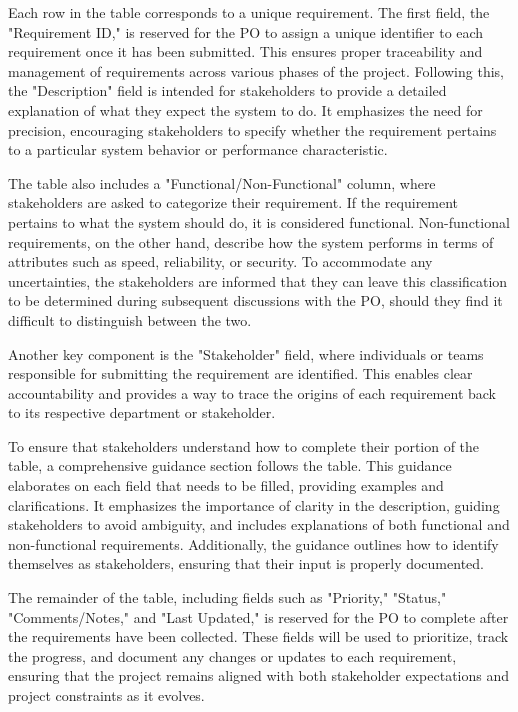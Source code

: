 Each row in the table corresponds to a unique requirement. The first field, the "Requirement ID," is reserved for the
\acs{PO} to assign a unique identifier to each requirement once it has been submitted. This ensures proper traceability
and management of requirements across various phases of the project. Following this, the "Description" field is intended
for stakeholders to provide a detailed explanation of what they expect the system to do. It emphasizes the need for
precision, encouraging stakeholders to specify whether the requirement pertains to a particular system behavior or
performance characteristic.

The table also includes a "Functional/Non-Functional" column, where stakeholders are asked to categorize their
requirement. If the requirement pertains to what the system should do, it is considered functional. Non-functional
requirements, on the other hand, describe how the system performs in terms of attributes such as speed, reliability, or
security. To accommodate any uncertainties, the stakeholders are informed that they can leave this classification to be
determined during subsequent discussions with the \acs{PO}, should they find it difficult to distinguish between the
two.

Another key component is the "Stakeholder" field, where individuals or teams responsible for submitting the requirement
are identified. This enables clear accountability and provides a way to trace the origins of each requirement back to
its respective department or stakeholder.

To ensure that stakeholders understand how to complete their portion of the table, a comprehensive guidance section
follows the table. This guidance elaborates on each field that needs to be filled, providing examples and
clarifications. It emphasizes the importance of clarity in the description, guiding stakeholders to avoid ambiguity, and
includes explanations of both functional and non-functional requirements. Additionally, the guidance outlines how to
identify themselves as stakeholders, ensuring that their input is properly documented.

The remainder of the table, including fields such as "Priority," "Status," "Comments/Notes," and "Last Updated," is
reserved for the \acs{PO} to complete after the requirements have been collected. These fields will be used to
prioritize, track the progress, and document any changes or updates to each requirement, ensuring that the project
remains aligned with both stakeholder expectations and project constraints as it evolves.


